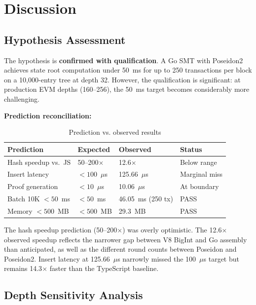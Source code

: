 \section{Discussion}
\label{sec:discussion}

\subsection{Hypothesis Assessment}

The hypothesis is \textbf{confirmed with qualification}. A Go SMT
with Poseidon2 achieves state root computation under 50~ms for up
to 250 transactions per block on a 10,000-entry tree at depth 32.
However, the qualification is significant: at production EVM depths
(160--256), the 50~ms target becomes considerably more challenging.

\textbf{Prediction reconciliation:}

\begin{table}[h]
\centering
\caption{Prediction vs. observed results}
\label{tab:predictions}
\begin{tabular}{llll}
\toprule
\textbf{Prediction} & \textbf{Expected} & \textbf{Observed} & \textbf{Status} \\
\midrule
Hash speedup vs.\ JS & 50--200$\times$ & 12.6$\times$ & Below range \\
Insert latency & $< 100$~$\mu$s & 125.66~$\mu$s & Marginal miss \\
Proof generation & $< 10$~$\mu$s & 10.06~$\mu$s & At boundary \\
Batch 10K $< 50$~ms & $< 50$~ms & 46.05~ms (250 tx) & PASS \\
Memory $< 500$~MB & $< 500$~MB & 29.3~MB & PASS \\
\bottomrule
\end{tabular}
\end{table}

The hash speedup prediction (50--200$\times$) was overly optimistic.
The 12.6$\times$ observed speedup reflects the narrower gap between
V8 BigInt and Go assembly than anticipated, as well as the different
round counts between Poseidon and Poseidon2. Insert latency at
125.66~$\mu$s narrowly missed the 100~$\mu$s target but remains
14.3$\times$ faster than the TypeScript baseline.

\subsection{Depth Sensitivity Analysis}

